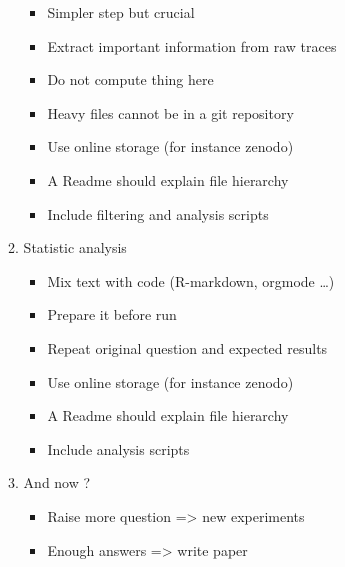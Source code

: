 \begin{itemize}
\begin{enumerate}
                \begin{itemize}
                    \item Simpler step but crucial
                    \item Extract important information from raw traces
                    \item Do not compute thing here
                    \item Heavy files cannot be in a git repository
                    \item Use online storage (for instance zenodo)
                    \item A Readme should explain file hierarchy
                    \item Include filtering and analysis scripts
                \end{itemize}
            \item Statistic analysis
                \begin{itemize}
                    \item Mix text with code (R-markdown, orgmode \ldots)
                    \item Prepare it before run
                    \item Repeat original question and expected results
                    \item Use online storage (for instance zenodo)
                    \item A Readme should explain file hierarchy
                    \item Include analysis scripts
                \end{itemize}
            \item And now ?
                \begin{itemize}
                    \item Raise more question => new experiments
                    \item Enough answers => write paper
                \end{itemize}
        \end{enumerate}
\end{itemize}

